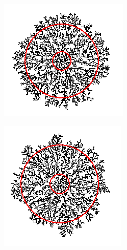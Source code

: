 \documentclass[12pt,a4paper]{scrartcl}
\numberwithin{equation}{subsection}
\newcommand{\1}{\mathbbm{1}}
\numberwithin{equation}{section}
\theoremstyle{definition}
\begin{document}
\begin{figure}[t]
	\begin{subfigure}[b]{.31\textwidth}
		\includegraphics[width=1\linewidth]{images/fractal_range/1.PNG}
	\end{subfigure}
	\begin{subfigure}[b]{.31\textwidth}
		\includegraphics[width=1\linewidth]{images/fractal_range/4.PNG}

\end{subfigure}
\end{figure}
\end{document}
